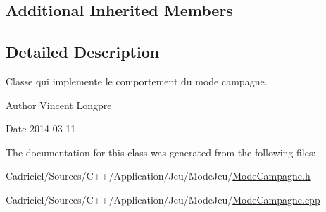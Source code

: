 \subsection*{Additional Inherited Members}


\subsection{Detailed Description}
Classe qui implemente le comportement du mode campagne. 

\begin{DoxyAuthor}{Author}
Vincent Longpre 
\end{DoxyAuthor}
\begin{DoxyDate}{Date}
2014-\/03-\/11 
\end{DoxyDate}


The documentation for this class was generated from the following files\-:\begin{DoxyCompactItemize}
\item 
Cadriciel/\-Sources/\-C++/\-Application/\-Jeu/\-Mode\-Jeu/\hyperlink{_mode_campagne_8h}{Mode\-Campagne.\-h}\item 
Cadriciel/\-Sources/\-C++/\-Application/\-Jeu/\-Mode\-Jeu/\hyperlink{_mode_campagne_8cpp}{Mode\-Campagne.\-cpp}\end{DoxyCompactItemize}
